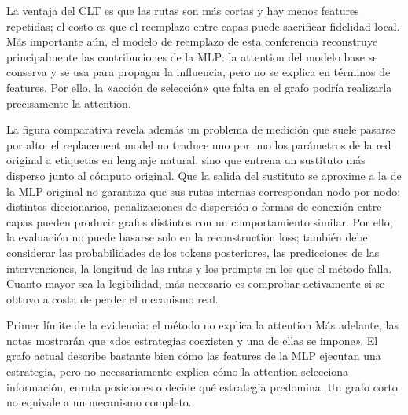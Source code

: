 


La ventaja del CLT es que las rutas son más cortas y hay menos features repetidas; el costo es que el reemplazo entre capas puede sacrificar fidelidad local. Más importante aún, el modelo de reemplazo de esta conferencia reconstruye principalmente las contribuciones de la MLP: la attention del modelo base se conserva y se usa para propagar la influencia, pero no se explica en términos de features. Por ello, la «acción de selección» que falta en el grafo podría realizarla precisamente la attention.

La figura comparativa revela además un problema de medición que suele pasarse por alto: el replacement model no traduce uno por uno los parámetros de la red original a etiquetas en lenguaje natural, sino que entrena un sustituto más disperso junto al cómputo original. Que la salida del sustituto se aproxime a la de la MLP original no garantiza que sus rutas internas correspondan nodo por nodo; distintos diccionarios, penalizaciones de dispersión o formas de conexión entre capas pueden producir grafos distintos con un comportamiento similar. Por ello, la evaluación no puede basarse solo en la reconstruction loss; también debe considerar las probabilidades de los tokens posteriores, las predicciones de las intervenciones, la longitud de las rutas y los prompts en los que el método falla. Cuanto mayor sea la legibilidad, más necesario es comprobar activamente si se obtuvo a costa de perder el mecanismo real.

\begin{warningbox}{Primer límite de la evidencia: el método no explica la attention}
Más adelante, las notas mostrarán que «dos estrategias coexisten y una de ellas se impone». El grafo actual describe bastante bien cómo las features de la MLP ejecutan una estrategia, pero no necesariamente explica cómo la attention selecciona información, enruta posiciones o decide qué estrategia predomina. Un grafo corto no equivale a un mecanismo completo.
\end{warningbox}

